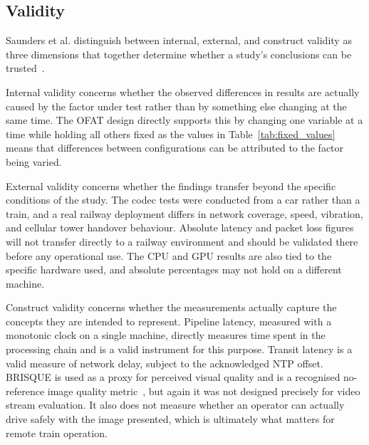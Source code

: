 \vspace{5mm}
\subsection{Validity}

Saunders et al. distinguish between internal, external, and construct validity as three dimensions that together determine whether a study's conclusions can be trusted~\cite{saunders2019}.

Internal validity concerns whether the observed differences in results are actually caused by the factor under test rather than by something else changing at the same time. The OFAT design directly supports this by changing one variable at a time while holding all others fixed as the values in Table~\ref{tab:fixed_values} means that differences between configurations can be attributed to the factor being varied.

External validity concerns whether the findings transfer beyond the specific conditions of the study. The codec tests were conducted from a car rather than a train, and a real railway deployment differs in network coverage, speed, vibration, and cellular tower handover behaviour. Absolute latency and packet loss figures will not transfer directly to a railway environment and should be validated there before any operational use. The CPU and GPU results are also tied to the specific hardware used, and absolute percentages may not hold on a different machine.

Construct validity concerns whether the measurements actually capture the concepts they are intended to represent. Pipeline latency, measured with a monotonic clock on a single machine, directly measures time spent in the processing chain and is a valid instrument for this purpose. Transit latency is a valid measure of network delay, subject to the acknowledged NTP offset. BRISQUE is used as a proxy for perceived visual quality and is a recognised no-reference image quality metric~\cite{mittal2012}, but again it was not designed precisely for video stream evaluation. It also does not measure whether an operator can actually drive safely with the image presented, which is ultimately what matters for remote train operation.

